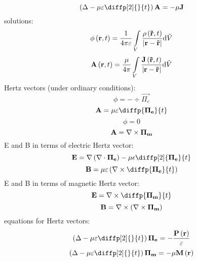 \begin{equation}
\left(\laplace{} - \mu \varepsilon \diffp[2]{}{t} \right)\vec{A} = -\mu \vec{J}
\end{equation}
solutions:
\begin{equation}
\phi\left(\mathbf{r}, t \right) = \frac{1}{4 \pi \varepsilon} \int\limits_{V} \frac{\rho\left(\mathbf{\tilde{r}}, t \right)}{\lvert\mathbf{r} - \mathbf{\tilde{r}}\rvert} \mathrm{d} \tilde{V}
\end{equation}
\begin{equation}
\mathbf{A}\left(\mathbf{r}, t \right) = \frac{\mu}{4 \pi} \int\limits_{V} \frac{\mathbf{J}\left(\mathbf{\tilde{r}}, t \right)}{\lvert\mathbf{r} - \mathbf{\tilde{r}}\rvert} \mathrm{d} \tilde{V}
\end{equation}
Hertz vectors (under ordinary conditions):
\begin{equation}
\phi = - \div{\vec{\Pi_e}}
\end{equation}
\begin{equation}
\vec{A} = \mu \varepsilon \diffp{\vec{\Pi_e}}{t}
\end{equation}
\begin{equation}
\phi = 0
\end{equation}
\begin{equation}
\mathbf{A} = \nabla \times \mathbf{\Pi_m}
\end{equation}
E and B in terms of electric Hertz vector:
\begin{equation}
\vec{E} = \grad{\left(\div{\vec{\Pi_e}}\right)} - \mu \epsilon \diffp[2]{\vec{\Pi_e}}{t}
\end{equation}
\begin{equation}
\vec{B} = \mu \varepsilon \left(\rot{\diffp{\vec{\Pi_e}}{t}}\right)
\end{equation}
E and B in terms of magnetic Hertz vector:
\begin{equation}
\vec{E} = \rot{\diffp{\vec{\Pi_m}}{t}}
\end{equation}
\begin{equation}
\mathbf{B} = \nabla \times \left(\nabla \times \mathbf{\Pi_m}\right)
\end{equation}
equations for Hertz vectors:
\begin{equation}
\left(\laplace{} - \mu \varepsilon \diffp[2]{}{t} \right) \vec{\Pi_e} = -\frac{\vec{P}\left(\vec{r} \right)}{\varepsilon}
\end{equation}
\begin{equation}
\left(\laplace{} - \mu \varepsilon \diffp[2]{}{t} \right) \vec{\Pi_m} = -\mu \vec{M}\left(\vec{r} \right)
\end{equation}
